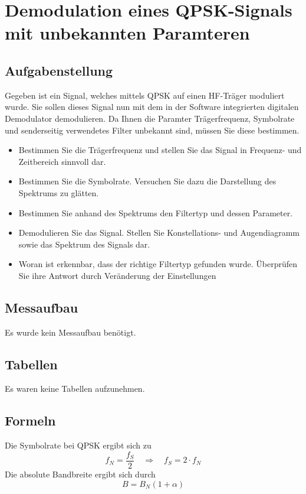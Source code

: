 \documentclass[12pt,a4paper,ngerman]{article}
\begin{document}


%
%

\section{Demodulation eines QPSK-Signals mit unbekannten Paramteren}
\subsection{Aufgabenstellung}
Gegeben ist ein Signal, welches mittels QPSK auf einen HF-Träger moduliert wurde. Sie sollen dieses Signal nun mit dem in der Software integrierten digitalen Demodulator demodulieren. Da Ihnen die Paramter Trägerfrequenz, Symbolrate und senderseitig verwendetes Filter unbekannt sind, müssen Sie diese bestimmen.
\begin{itemize}
\item Bestimmen Sie die Trägerfrequenz und stellen Sie das Signal in Frequenz- und Zeitbereich sinnvoll dar. 
\item Bestimmen Sie die Symbolrate. Versuchen Sie dazu die Darstellung des Spektrums zu glätten.
\item Bestimmen Sie anhand des Spektrums den Filtertyp und dessen Parameter.
\item Demodulieren Sie das Signal. Stellen Sie Konstellations- und Augendiagramm sowie das Spektrum des Signals dar. 
\item Woran ist erkennbar, dass der richtige Filtertyp gefunden wurde. Überprüfen Sie ihre Antwort durch Veränderung der Einstellungen
\end{itemize}
\cite[18]{skript}

\subsection{Messaufbau}
Es wurde kein Messaufbau benötigt.
\subsection{Tabellen}
Es waren keine Tabellen aufzunehmen. 
\subsection{Formeln}
Die Symbolrate bei QPSK ergibt sich zu
\begin{equation}
f_N = \frac{f_S}{2} \quad \Rightarrow \quad f_S = 2 \cdot f_N
\end{equation}
Die absolute Bandbreite ergibt sich durch
\begin{equation}
B = B_N (1+\alpha)
\end{equation}
\pagebreak
\end{document}
